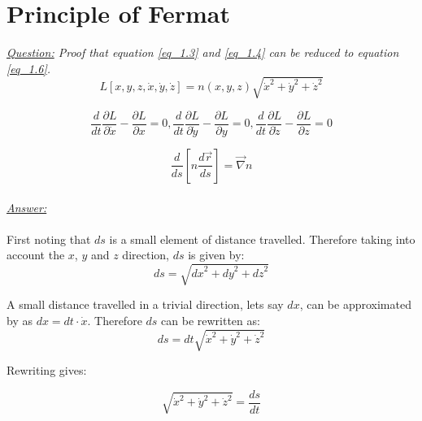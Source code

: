 \documentclass{article}
\begin{document}
\section{Principle of Fermat}

\textit{\underline{Question:} Proof that equation \ref{eq_1.3} and \ref{eq_1.4} can be reduced to equation \ref{eq_1.6}.} \\

\begin{equation}
	\label{eq_1.3}
	L[x,y,z,\dot{x},\dot{y},\dot{z}] = n(x,y,z)\sqrt{\dot{x}^2+\dot{y}^2+\dot{z}^2}
\end{equation}

\begin{equation}
	\label{eq_1.4}
	\frac{d}{dt} \frac{\partial L}{\partial \dot{x}} - \frac{\partial L}{\partial x} = 0, \frac{d}{dt} \frac{\partial L}{\partial \dot{y}} - \frac{\partial L}{\partial y} = 0, \frac{d}{dt} \frac{\partial L}{\partial \dot{z}} - \frac{\partial L}{\partial z} = 0
\end{equation}

\begin{equation}
	\label{eq_1.6}
	\frac{d}{ds} \left[ n \frac{d \vec{r}}{ds} \right] = \vec{\nabla} n
\end{equation} \\
\textit{\underline{Answer:}}\\
\\
First noting that $ds$ is a small element of distance travelled. Therefore taking into account the $x$, $y$ and $z$ direction, $ds$ is given by: \\

\begin{equation}
	ds = \sqrt{{dx}^2+{dy}^2+{dz}^2}
\end{equation}

A small distance travelled in a trivial direction, lets say $dx$, can be approximated by as $dx = dt \cdot \dot{x}$. Therefore $ds$ can be rewritten as: \\

\begin{equation}
	ds = dt \sqrt{\dot{x}^2+\dot{y}^2+\dot{z}^2}
\end{equation}

Rewriting gives:

\begin{equation}
	\label{eq_dsdt}
	\sqrt{\dot{x}^2+\dot{y}^2+\dot{z}^2} = \frac{ds}{dt}
\end{equation}
\end{document}
